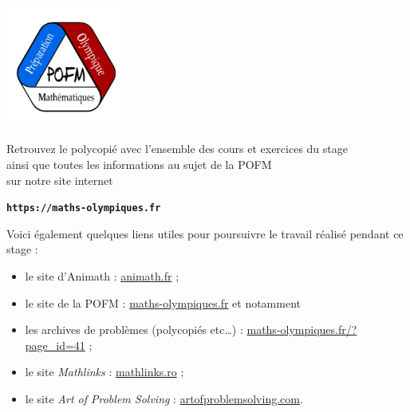 \thispagestyle{empty} 

\mbox{ }

\vfill

\begin{center}
  \includegraphics[width=4cm]{01-Intro/logos/pofm.png}
  
  \vspace{1cm}
  
  Retrouvez le polycopié avec l'ensemble des cours et exercices du stage\\
  ainsi que toutes les informations au sujet de la POFM\\
  sur notre site internet
  
  \smallskip

  \textbf{\texttt{https://maths-olympiques.fr}}
  
  \bigskip
  
Voici également quelques liens utiles pour poursuivre le travail réalisé pendant ce stage :
\begin{itemize}
\item le site d'Animath : \href{http://www.animath.fr}{animath.fr} ;
\item le site de la POFM : \href {http://www.maths-olympiques.fr}{maths-olympiques.fr} et notamment 
\item les archives de problèmes (polycopiés etc\ldots) : \href{http://www.maths-olympiques.fr/?page_id=41}{maths-olympiques.fr/?page\_id=41} ;
\item le site \emph{Mathlinks} : \href{http://www.mathlinks.ro}{mathlinks.ro} ;
\item le site \emph{Art of Problem Solving} : \href{https://www.artofproblemsolving.com}{artofproblemsolving.com}.
\end{itemize}

\end{center}

\vfill